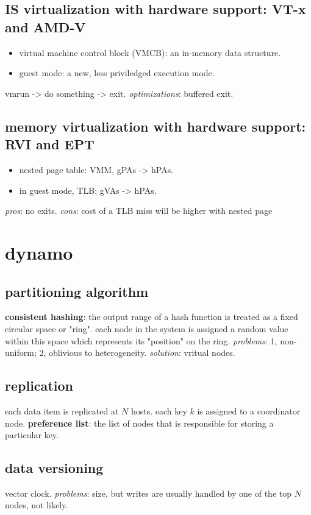 \documentclass[9pt,conference]{IEEEtran}
\begin{document}
\subsection{IS virtualization with hardware support: VT-x and AMD-V}
\label{sec-9-4}
\begin{itemize}
\item virtual machine control block (VMCB): an in-memory data structure.
\item guest mode: a new, less priviledged execution mode.
\end{itemize}
vmrun -> do something -> exit.
\emph{optimizations}: buffered exit.

\subsection{memory virtualization with hardware support: RVI and EPT}
\label{sec-9-5}
\begin{itemize}
\item nested page table: VMM, gPAs -> hPAs.
\item in guest mode, TLB: gVAs -> hPAs.
\end{itemize}
\emph{pros}: no exits. \emph{cons}: cost of a TLB miss will be higher with nested page

\section{dynamo}
\label{sec-10}
\subsection{partitioning algorithm}
\label{sec-10-1}
\textbf{consistent hashing}: the output range of a hash function is treated as
a fixed circular space or "ring".
each node in the system is assigned a random value within this space
which represents its "position" on the ring.
\emph{problems}: 1, non-uniform; 2, oblivious to heterogeneity.
\emph{solution}: vritual nodes.

\subsection{replication}
\label{sec-10-2}
each data item is replicated at $N$ hosts.
each key $k$ is assigned to a coordinator node.
\textbf{preference list}: the list of nodes that is responsible for storing a particular key.

\subsection{data versioning}
\label{sec-10-3}
vector clock.
\emph{problems}: size, but writes are usually handled by one of the top $N$ nodes, not likely.
\end{document}
